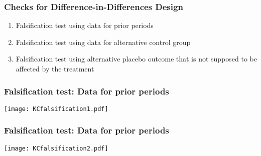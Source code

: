 \documentclass{beamer}
\numberwithin{equation}{section}
\begin{document}
\begin{frame}
  \frametitle{Checks for Difference-in-Differences Design}
\begin{enumerate}
 \item Falsification test using data for prior periods \bigskip
\item Falsification test using data for alternative control group \bigskip
\item Falsification test using alternative placebo outcome that is not supposed to be affected by the treatment
\end{enumerate}
\end{frame}


\begin{frame}
  \frametitle{Falsification test: Data for prior periods}
  \vspace{-.2in}
\begin{center}
  \texttt{[image: KCfalsification1.pdf]}
\end{center}
\end{frame}

\begin{frame}
  \frametitle{Falsification test: Data for prior periods}
  \vspace{-.2in}
\begin{center}
  \texttt{[image: KCfalsification2.pdf]}
\end{center}
\end{frame}
\end{document}
